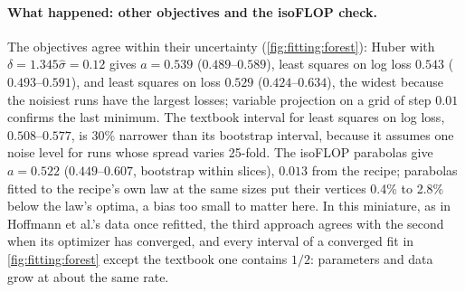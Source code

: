\begin{refsection}
\paragraph{What happened: other objectives and the isoFLOP check.} The objectives agree within their uncertainty (\cref{fig:fitting:forest}): Huber with $\delta=1.345\hat\sigma=0.12$ gives $a=0.539$ ($0.489$--$0.589$), least squares on log loss $0.543$ ($0.493$--$0.591$), and least squares on loss $0.529$ ($0.424$--$0.634$), the widest because the noisiest runs have the largest losses; variable projection on a grid of step $0.01$ confirms the last minimum. The textbook interval for least squares on log loss, $0.508$--$0.577$, is 30\% narrower than its bootstrap interval, because it assumes one noise level for runs whose spread varies 25-fold. The isoFLOP parabolas give $a=0.522$ ($0.449$--$0.607$, bootstrap within slices), $0.013$ from the recipe; parabolas fitted to the recipe's own law at the same sizes put their vertices 0.4\% to 2.8\% below the law's optima, a bias too small to matter here. In this miniature, as in Hoffmann et al.'s data once refitted, the third approach agrees with the second when its optimizer has converged, and every interval of a converged fit in \cref{fig:fitting:forest} except the textbook one contains $1/2$: parameters and data grow at about the same rate.


\end{refsection}
